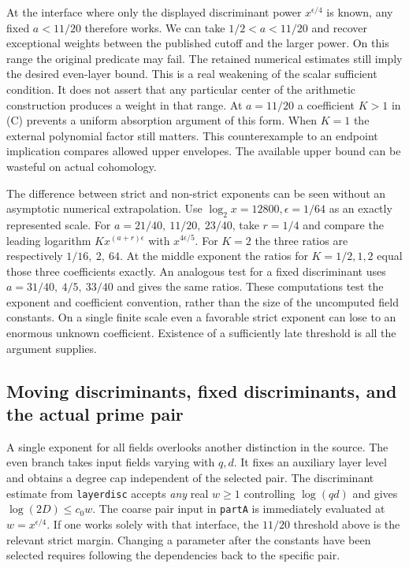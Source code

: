 \documentclass[12pt,letterpaper]{article}
\begin{document}
At the interface where only the displayed discriminant power \(x^{\epsilon/4}\) is known, any fixed \(a<11/20\) therefore works. We can take \(1/2<a<11/20\) and recover exceptional weights between the published cutoff and the larger power. On this range the original predicate may fail. The retained numerical estimates still imply the desired even-layer bound. This is a real weakening of the scalar sufficient condition. It does not assert that any particular center of the arithmetic construction produces a weight in that range. At \(a=11/20\) a coefficient \(K>1\) in (C) prevents a uniform absorption argument of this form. When \(K=1\) the external polynomial factor still matters. This counterexample to an endpoint implication compares allowed upper envelopes. The available upper bound can be wasteful on actual cohomology.

The difference between strict and non-strict exponents can be seen without an asymptotic numerical extrapolation. Use \(\log_2 x=12800,\epsilon=1/64\) as an exactly represented scale. For \(a=21/40,\ 11/20,\ 23/40\), take \(r=1/4\) and compare the leading logarithm \(Kx^{(a+r)\epsilon}\) with \(x^{4\epsilon/5}\). For \(K=2\) the three ratios are respectively \(1/16,\ 2,\ 64\). At the middle exponent the ratios for \(K=1/2,1,2\) equal those three coefficients exactly. An analogous test for a fixed discriminant uses \(a=31/40,\ 4/5,\ 33/40\) and gives the same ratios. These computations test the exponent and coefficient convention, rather than the size of the uncomputed field constants. On a single finite scale even a favorable strict exponent can lose to an enormous unknown coefficient. Existence of a sufficiently late threshold is all the argument supplies.

\subsection{Moving discriminants, fixed discriminants, and the actual prime pair}
A single exponent for all fields overlooks another distinction in the source. The even branch takes input fields varying with \(q,d\). It fixes an auxiliary layer level and obtains a degree cap independent of the selected pair. The discriminant estimate from \texttt{layerdisc} accepts \emph{any} real \(w\ge1\) controlling \(\log(qd)\) and gives \(\log(2D)\le c_0w\). The coarse pair input in \texttt{partA} is immediately evaluated at \(w=x^{\epsilon/4}\). If one works solely with that interface, the \(11/20\) threshold above is the relevant strict margin. Changing a parameter after the constants have been selected requires following the dependencies back to the specific pair.  
\end{document}
